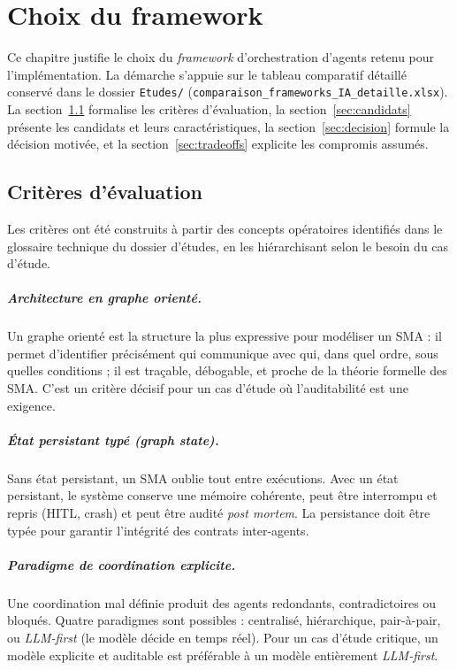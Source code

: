\chapter{Choix du framework}
\label{chap:choix_framework}

Ce chapitre justifie le choix du \emph{framework} d'orchestration d'agents retenu pour l'implémentation. La démarche s'appuie sur le tableau comparatif détaillé conservé dans le dossier \texttt{Etudes/} (\texttt{comparaison\_frameworks\_IA\_detaille.xlsx}). La section~\ref{sec:criteres} formalise les critères d'évaluation, la section~\ref{sec:candidats} présente les candidats et leurs caractéristiques, la section~\ref{sec:decision} formule la décision motivée, et la section~\ref{sec:tradeoffs} explicite les compromis assumés.

\section{Critères d'évaluation}
\label{sec:criteres}

Les critères ont été construits à partir des concepts opératoires identifiés dans le glossaire technique du dossier d'études, en les hiérarchisant selon le besoin du cas d'étude.

\paragraph{Architecture en graphe orienté.}
Un graphe orienté est la structure la plus expressive pour modéliser un SMA : il permet d'identifier précisément qui communique avec qui, dans quel ordre, sous quelles conditions ; il est traçable, débogable, et proche de la théorie formelle des SMA. C'est un critère décisif pour un cas d'étude où l'auditabilité est une exigence.

\paragraph{État persistant typé (\emph{graph state}).}
Sans état persistant, un SMA oublie tout entre exécutions. Avec un état persistant, le système conserve une mémoire cohérente, peut être interrompu et repris (HITL, crash) et peut être audité \emph{post mortem}. La persistance doit être typée pour garantir l'intégrité des contrats inter-agents.

\paragraph{Paradigme de coordination explicite.}
Une coordination mal définie produit des agents redondants, contradictoires ou bloqués. Quatre paradigmes sont possibles : centralisé, hiérarchique, pair-à-pair, ou \emph{LLM-first} (le modèle décide en temps réel). Pour un cas d'étude critique, un modèle explicite et auditable est préférable à un modèle entièrement \emph{LLM-first}.

